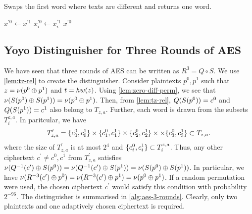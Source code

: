 \documentclass[twoside]{article}
\begin{document}
\begin{algorithm}
    \caption{Swaps the first word where texts are different and returns one word.}
    \label{alg:simple-swap}
    \begin{algorithmic}[1]
         
            \State \(x^{\prime 0} \gets x^{\prime 1}\)
                    \State \(x_i^{\prime 0} \gets x_i^{\prime 1}\)
                    \State \Return \(x^{\prime 0}\)
                \EndIf
            \EndFor
        \EndFunction
    \end{algorithmic}
\end{algorithm}

\subsection{Yoyo Distinguisher for Three Rounds of AES}

We have seen that three rounds of AES can be written as \(R^3 = Q \circ S\). We
use \autoref{lem:tz-rel} to create the distinguisher. Consider plaintexts \(p^0,
p^1\) such that \(z = \nu(p^0 \oplus p^1)\) and \(t = hw(z)\). Using
\autoref{lem:zero-diff-perm}, we see that \(\nu(S(p^0) \oplus
S(p^1)) = \nu(p^0 \oplus p^1)\). Then, from \autoref{lem:tz-rel},
\(Q(S(p^0)) = c^0\) and \(Q(S(p^1)) = c^1\) also belong to
\(T_{z, a}\). Further, each word is drawn from the subsets \(T_i^{z, a}\). In
paritcular, we have
\begin{equation}
    T_{z, a}^\prime = \{c_0^0, c_0^1\} \times \{c_1^0, c_1^1\} \times \{c_2^0, c_2^1\} \times \times \{c_3^0, c_3^1\} \subset T_{z, a}.
\end{equation}
where the size of \(T_{z, a}^\prime\) is at most \(2^4\) and \(\{c_i^0,
c_i^1\} \subset T_i^{z, a}\). Thus, any other ciphertext \(c^\prime \ne c^0,
c^1\) from \(T_{z, a}^\prime\) satisfies \(\nu(Q^{-1}(c^\prime) \oplus
S(p^0)) = \nu(Q^{-1}(c^\prime) \oplus S(p^1)) =
\nu(S(p^0) \oplus S(p^1))\). In particular, we have
\(\nu(R^{-3}(c^\prime) \oplus p^0) = \nu(R^{-3}(c^\prime)
\oplus p^1) = \nu(p^0 \oplus p^1)\). If a random permutation were used, the
chosen ciphertext \(c^\prime\) would satisfy this condition with probability
\(2^{-96}\). The distinguisher is summarised in \autoref{alg:aes-3-rounds}.
Clearly, only two plaintexts and one adaptively chosen ciphertext is required.
\end{document}
